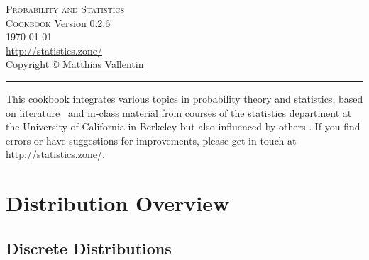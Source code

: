\documentclass[landscape]{article}
\newcommand{\version}{0.2.6}
\def\web{\url{http://statistics.zone/}}
\begin{document}
\thispagestyle{empty}
\begin{center}
  \vspace*{\fill}
  \textsc{\Huge Probability and Statistics\\[2ex] \huge Cookbook}
  \vfill
  \footnotesize{
    Version \version\\[1ex]
    \today\\[1ex]
    \web\\[1ex]
    Copyright \copyright{}
    \href{http://matthias.vallentin.net}{Matthias Vallentin}\\
  }
\end{center}

\newpage

\thispagestyle{empty}
\begin{multicols*}{3}
  \tableofcontents
  \vfill
  \hrule
  \vspace{5pt}
  {\footnotesize This cookbook integrates various topics in probability theory
  and statistics, based on literature~\cite{Hoel72,Wasserman03,Shumway06}
  and in-class material from courses of the statistics department at the
  University of California in Berkeley but also influenced by others
  \cite{Steger01,Steger02}. If you find errors or have suggestions for
  improvements, please get in touch at \web.}
\end{multicols*}

\newpage

\section{Distribution Overview}

\subsection{Discrete Distributions}
\end{document}
